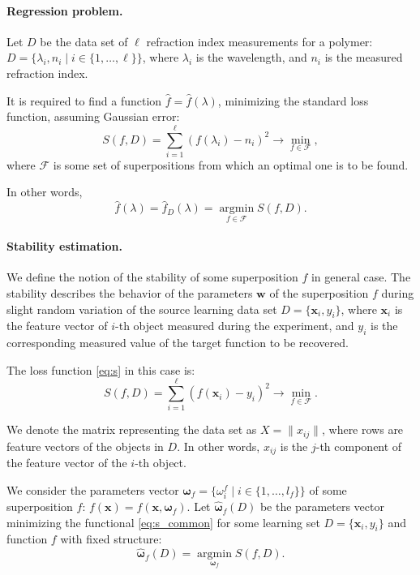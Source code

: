 \documentclass[11pt,a4paper]{article}
\theoremstyle{definition}
\begin{document}
\paragraph{Regression problem.}
Let $D$ be the data set of $\ell$ refraction index measurements for a polymer:
$D = \{ \lambda_i, n_i \mid i \in \{ 1, \dots, \ell \} \}$, where $\lambda_i$ is the wavelength,
and $n_i$ is the measured refraction index.

It is required to find a function $\hat{f} = \hat{f}(\lambda)$, minimizing the standard
loss function, assuming Gaussian error:
\begin{equation}
  S(f, D) = \sum_{i = 1}^\ell (f(\lambda_i) - n_i)^2 \rightarrow \min_{f \in \mathcal{F}},
  \label{eq:s}
\end{equation}
where $\mathcal{F}$ is some set of superpositions from which an optimal one is to be found.

In other words,
\begin{equation}
  \hat{f}(\lambda) = \hat{f}_D(\lambda) = \mathop{\arg \min}\limits_{f \in \mathcal{F}} S(f, D).
  \label{eq:fhat}
\end{equation}

\paragraph{Stability estimation.}
We define the notion of the stability of some superposition $f$ in general case.
The stability describes the behavior of the parameters $\boldsymbol{w}$ of the superposition
$f$ during slight random variation of the source learning data set
$D = \{ \mathbf{x}_i, y_i \}$,
where $\mathbf{x}_i$ is the feature vector of $i$-th object measured during
the experiment, and $y_i$ is the corresponding measured value of the target function
to be recovered.

The loss function \eqref{eq:s} in this case is:
\begin{equation}
  S(f, D) = \sum_{i = 1}^\ell (f(\mathbf{x}_i) - y_i)^2 \rightarrow \min_{f \in \mathcal{F}}.
  \label{eq:s_common}
\end{equation}

We denote the matrix representing the data set as $X = \| x_{ij} \|$, where 
rows are feature vectors of the objects in $D$. In other words, $x_{ij}$
is the $j$-th component of the feature vector of the $i$-th object.

We consider the parameters vector
$\boldsymbol{\omega}_f = \{ \omega_i^f \mid i \in \{ 1, \dots, l_f \} \}$
of some superposition $f$: $f(\mathbf{x}) = f(\mathbf{x}, \boldsymbol{\omega}_f)$.
Let $\hat{\boldsymbol{\omega}}_f(D)$ be the parameters vector minimizing the
functional \eqref{eq:s_common} for some learning set $D = \{ \mathbf{x}_i, y_i \}$ and
function $f$ with fixed structure:
\[
  \hat{\boldsymbol{\omega}}_f(D) = \mathop{\arg \min}\limits_{\boldsymbol{\omega}_f} S(f, D).
\]
\end{document}
